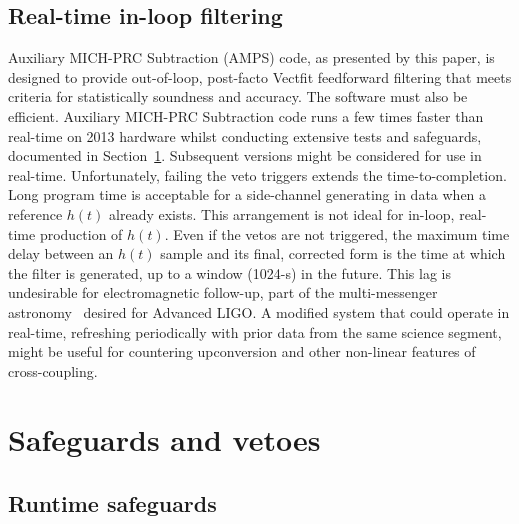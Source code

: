 


        \subsection{Real-time in-loop filtering}
        \label{real-time}
      
            Auxiliary MICH-PRC Subtraction (AMPS) code, as presented by this paper, is designed to provide out-of-loop, post-facto Vectfit feedforward filtering that meets criteria for statistically soundness and accuracy. The software must also be efficient. Auxiliary MICH-PRC Subtraction code runs a few times faster than real-time on 2013 hardware whilst conducting extensive tests and safeguards, documented in Section~\ref{safeguards}. Subsequent versions might be considered for use in real-time. Unfortunately, failing the veto triggers extends the time-to-completion. Long program time is acceptable for a side-channel generating in data when a reference $h(t)$ already exists. This arrangement is not ideal for in-loop, real-time production of $h(t)$. Even if the vetos are not triggered, the maximum time delay between an $h(t)$ sample and its final, corrected form is the time at which the filter is generated, up to a window (1024-s) in the future. This lag is undesirable for electromagnetic follow-up, part of the multi-messenger astronomy~\cite{Swift2012,Antares2013} desired for Advanced LIGO. A modified system that could operate in real-time, refreshing periodically with prior data from the same science segment, might be useful for countering upconversion and other non-linear features of cross-coupling.

\section{Safeguards and vetoes}
\label{safeguards}

    \subsection{Runtime safeguards}
    \label{runtimeSafeguards}

